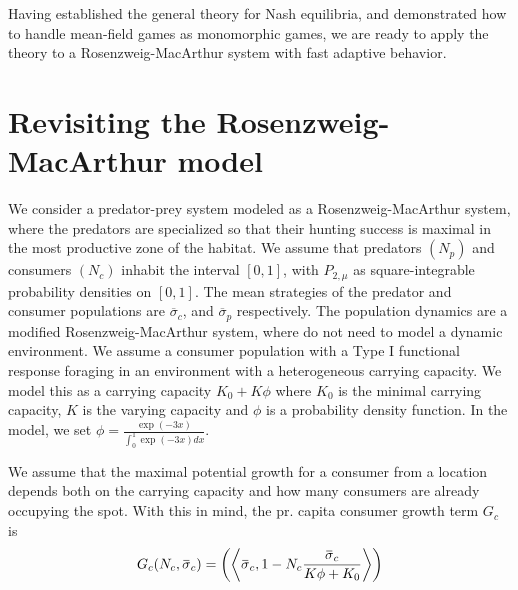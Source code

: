 Having established the general theory for Nash equilibria, and demonstrated how to handle mean-field games as monomorphic games, we are ready to apply the theory to a Rosenzweig-MacArthur system with fast adaptive behavior.
\section{Revisiting the Rosenzweig-MacArthur model}
\label{sec:model_rm}
We consider a predator-prey system modeled as a Rosenzweig-MacArthur system, where the predators are specialized so that their hunting success is maximal in the most productive zone of the habitat.
We assume that predators $(N_p)$ and consumers $(N_c)$ inhabit the interval $[0,1]$, with $P_{2,\mu}$ as square-integrable probability densities on $[0,1]$. The mean strategies of the predator and consumer populations are $\overbar{\sigma}_c$, and $\overbar{\sigma}_p$ respectively.
The population dynamics are a modified Rosenzweig-MacArthur system, where do not need to model a dynamic environment. We assume a consumer population with a Type I functional response foraging in an environment with a heterogeneous carrying capacity. We model this as a carrying capacity $K_0 + K \phi$ where $K_0$ is the minimal carrying capacity, $K$ is the varying capacity and $\phi$ is a probability density function. In the model, we set  $\phi = \frac{\exp(-3 x)}{\int_0^1 \exp(-3 x) dx}$.

We assume that the maximal potential growth for a consumer from a location depends both on the carrying capacity and how many consumers are already occupying the spot. With this in mind, the pr. capita consumer growth term $G_c$ is
\begin{equation}
  G_c(N_c, \overbar{\sigma}_c) = \pa{\ip{\overbar{\sigma}_c}{1-N_c \frac{\overbar{\sigma}_c}{K\phi + K_0}}}
\end{equation}

